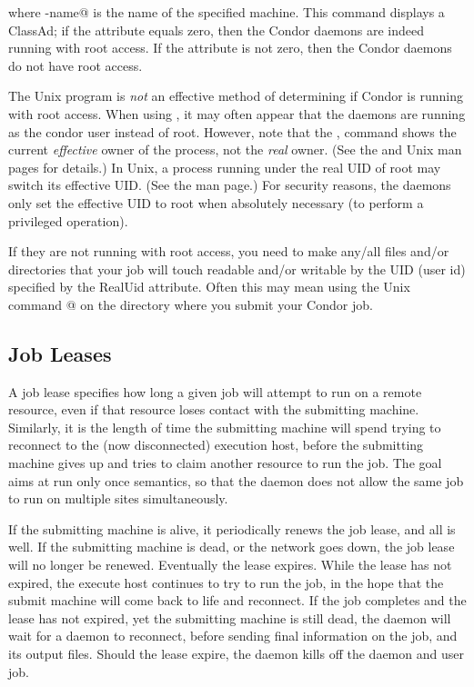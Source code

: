 where \verb@machine-name@ is the name of the specified machine.
This command displays a  ClassAd; if the
attribute  equals zero,
then the Condor daemons are indeed
running with root access.  If the
 attribute is not zero, then the Condor daemons do not have
root access.

\Note The Unix program 
is \emph{not} an effective
method of determining if Condor is running with root access.
When using ,
it may often appear that the daemons are
running as the condor user instead of root.
However, note that the ,
command shows the current \emph{effective} owner of the
process, not the \emph{real} owner.  (See the  and
 Unix man pages for details.)  In Unix, a process
running under the real UID of root may switch its effective UID.
(See the  man page.)
For security reasons, the daemons
only set the effective UID to root when absolutely necessary
(to perform a privileged operation).

If they are not running with root access, you need to make any/all files
and/or directories that your job will touch readable and/or writable by
the UID (user id) specified by the RealUid attribute.
Often this may
mean using the Unix command @
on the directory where you submit your Condor job.

\subsection{\label{sec:Job-Lease}
Job Leases}

A job lease specifies how long a given job will attempt to run
on a remote resource,
even if that resource loses contact with the submitting machine.
Similarly, it is the length of time the submitting machine will
spend trying to reconnect to the (now disconnected) execution host,
before the submitting machine gives up and tries to claim
another resource to run the job.
The goal aims at run only once semantics,
so that the  daemon does not allow the same job
to run on multiple sites simultaneously.

If the submitting machine is alive,
it periodically renews the job lease,
and all is well.
If the submitting machine is dead,
or the network goes down, the job lease will no longer be renewed.
Eventually the lease expires.
While the lease has not expired,
the execute host continues to try to run the job,
in the hope that the submit machine will come back to life
and reconnect.
If the job completes and the lease has not expired, yet the 
submitting machine is still dead,
the  daemon will wait for a
 daemon to reconnect, 
before sending final information on the job,
and its output files.
Should the lease expire, the  daemon
kills off the  daemon and user job.

